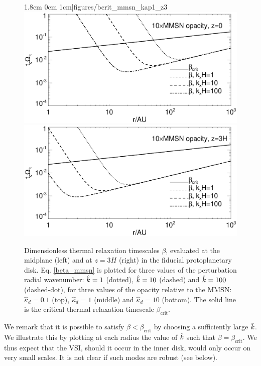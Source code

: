 \begin{figure}
  1.8cm 0cm 1cm]{figures/bcrit_mmsn_kap1_z3}\\
  \includegraphics[scale=.47,clip=true,trim=0cm 0cm 0cm
  1cm]{figures/bcrit_mmsn_kap10_z0}\includegraphics[scale=.47,clip=true,trim=2.5cm 0cm 0cm
  1cm]{figures/bcrit_mmsn_kap10_z3} 
  \caption{Dimensionless thermal relaxation timescales $\beta$,
    evaluated at the midplane (left) and at $z=3H$ (right) in the
    fiducial protoplanetary disk. Eq. \ref{beta_mmsn} is plotted  
    for three values of the 
    perturbation radial wavenumber: $\hat{k}=1$ (dotted), $\hat{k}=10$
    (dashed) and $\hat{k}=100$ (dashed-dot), for three values of the
    opacity relative to the MMSN: $\hat{\kappa}_d=0.1$ (top),
    $\hat{\kappa}_d=1$ (middle) and $\hat{\kappa}_d=10$ (bottom).  
    The solid line is the 
    critical thermal relaxation timescale $\beta_\mathrm{crit}$. 
    \label{mmsn_bcrit_bcool}}   
\end{figure}  

We remark that it is possible to satisfy $\beta < \beta_\mathrm{crit}$
by choosing a sufficiently large $\hat{k}$. We
illustrate this by plotting at each radius the value of $\hat{k}$ such
that $\beta = \beta_\mathrm{crit}$. We thus expect that the VSI,
should it occur in the inner disk, would only occur on very small
scales. It is not clear if such modes are robust (see below). 

